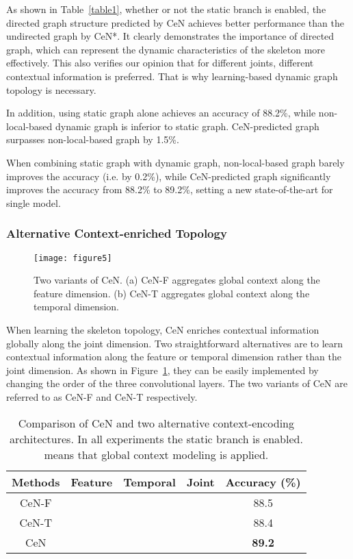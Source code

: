 \documentclass[sigconf]{acmart}
\begin{document}
As shown in Table~\ref{table1}, whether or not the static branch is enabled, the directed graph structure predicted by CeN achieves better performance than the undirected graph by CeN*. It clearly demonstrates the importance of directed graph, which can represent the dynamic characteristics of the skeleton more effectively. This also verifies our opinion that for different joints, different contextual information is preferred. That is why learning-based dynamic graph topology is necessary.

In addition, using static graph alone achieves an accuracy of 88.2\%, while non-local-based dynamic graph is inferior to static graph. CeN-predicted graph surpasses non-local-based graph by 1.5\%.

When combining static graph with dynamic graph, non-local-based graph barely improves the accuracy (i.e. by 0.2\%), while CeN-predicted graph significantly improves the accuracy from 88.2\% to 89.2\%, setting a new state-of-the-art for single model.

\subsubsection{Alternative Context-enriched Topology}

\begin{figure}[t]
  \begin{center}
\texttt{[image: figure5]} \end{center}
\caption{Two variants of CeN. (a) CeN-F aggregates global context along the feature dimension. (b) CeN-T aggregates global context along the temporal dimension.}
\label{fig5}
\end{figure}



When learning the skeleton topology, CeN enriches contextual information globally along the joint dimension. Two straightforward alternatives are to learn contextual information along the feature or temporal dimension rather than the joint dimension. As shown in Figure~\ref{fig5}, they can be easily implemented by changing the order of the three  convolutional layers. The two variants of CeN are referred to as CeN-F and CeN-T respectively.

\begin{table}[t]
  \caption{Comparison of CeN and two alternative context-encoding architectures. In all experiments the static branch is enabled.  means that global context modeling is applied.}
  \label{table2}\begin{tabular}{c|c|c|c|c}
    \toprule
    Methods  & Feature & Temporal  & Joint & Accuracy (\%) \\
    \midrule
    CeN-F   &      &       &       & 88.5  \\
    CeN-T &       &      &       & 88.4  \\
    CeN &       &       &      & \textbf{89.2}  \\
    \bottomrule
    \end{tabular}\end{table}
\end{document}

